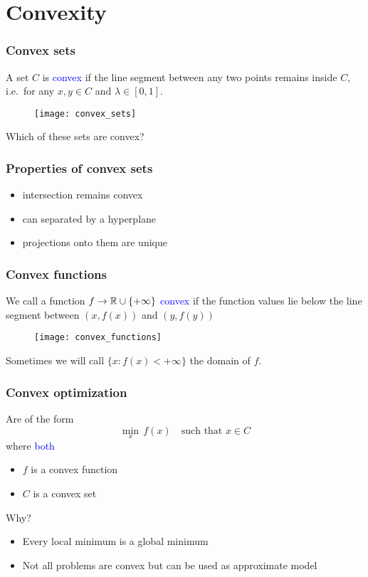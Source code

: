 \documentclass{beamer}
\begin{document}
\section{Convexity}%
\label{sec:}

\begin{frame}
  \frametitle{Convex sets}
  A set $C$ is \textcolor{blue}{convex} if the line segment between any two points remains inside $C$, i.e.\ for any $x,y \in C$ and $\lambda\in [0,1]$.
  \begin{figure}[ht]
    \centering
    \texttt{[image: convex\_sets]}
  \end{figure}
  \begin{center}
    Which of these sets are convex?
  \end{center}

\end{frame}

\begin{frame}
  \frametitle{Properties of convex sets}
  \begin{itemize}
    \item intersection remains convex
    \item can separated by a hyperplane
    \item projections onto them are unique
  \end{itemize}
\end{frame}


\begin{frame}
  \frametitle{Convex functions}
  We call a function $f \to \mathbb{R}\cup\{+\infty\}$ \textcolor{blue}{convex} if the function values lie below the line segment between $(x, f(x))$ and $(y, f(y))$
  \begin{figure}[ht]
    \centering
    \texttt{[image: convex\_functions]}
  \end{figure}

  Sometimes we will call $\{x: f(x)< +\infty \}$ the domain of $f$.

\end{frame}


\begin{frame}
  \frametitle{Convex optimization}
  Are of the form
  \begin{equation}
    \min_x \, f(x) \quad \text{such that $x\in C$}
  \end{equation}
  where \textcolor{blue}{both}
  \begin{itemize}
    \item $f$ is a convex function
    \item $C$ is a convex set
  \end{itemize}
  Why?
  \begin{itemize}
    \item Every local minimum is a global minimum
    \item Not all problems are convex but can be used as approximate model
  \end{itemize}

\end{frame}
\end{document}
